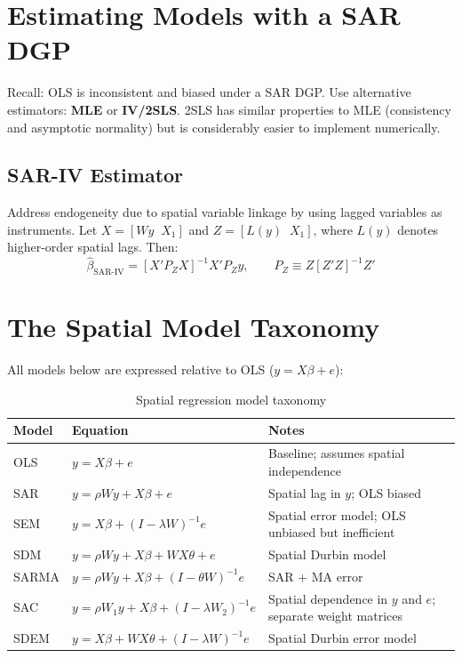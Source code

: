 \section{Estimating Models with a SAR DGP}
\label{sec_EstimatingSAR}

Recall: OLS is inconsistent and biased under a SAR DGP. Use alternative
estimators: \textbf{MLE} or \textbf{IV/2SLS}. 2SLS has similar properties
to MLE (consistency and asymptotic normality) but is considerably easier
to implement numerically.

\subsection{SAR-IV Estimator}

Address endogeneity due to spatial variable linkage by using lagged variables
as instruments. Let $X = [Wy\;\; X_1]$ and $Z = [L(y)\;\; X_1]$, where
$L(y)$ denotes higher-order spatial lags. Then:
\begin{equation}
  \hat\beta_\text{SAR-IV} = [X'P_ZX]^{-1}X'P_Zy,
  \qquad P_Z \equiv Z[Z'Z]^{-1}Z'
\end{equation}


\section{The Spatial Model Taxonomy}
\label{sec_SpatialTaxonomy}

All models below are expressed relative to OLS ($y = X\beta + e$):

\renewcommand{\arraystretch}{1.5}
\begin{table}[htp]
\centering
\caption{Spatial regression model taxonomy}
\label{tbl_SpatialModels}
\begin{tabular}{@{}lp{5.5cm}p{4.5cm}@{}}
\toprule
\textbf{Model} & \textbf{Equation} & \textbf{Notes} \\
\midrule
OLS  & $y = X\beta + e$ & Baseline; assumes spatial independence \\
SAR  & $y = \rho Wy + X\beta + e$ & Spatial lag in $y$; OLS biased \\
SEM  & $y = X\beta + (I-\lambda W)^{-1}e$ & Spatial error model; OLS unbiased but inefficient \\
SDM  & $y = \rho Wy + X\beta + WX\theta + e$ & Spatial Durbin model \\
SARMA & $y = \rho Wy + X\beta + (I-\theta W)^{-1}e$ & SAR + MA error \\
SAC  & $y = \rho W_1y + X\beta + (I-\lambda W_2)^{-1}e$ & Spatial dependence in $y$ and $e$; separate weight matrices \\
SDEM & $y = X\beta + WX\theta + (I-\lambda W)^{-1}e$ & Spatial Durbin error model \\
\bottomrule
\end{tabular}
\end{table}
\renewcommand{\arraystretch}{1}



